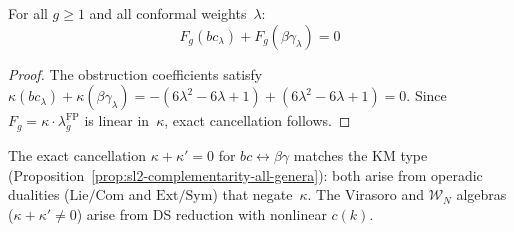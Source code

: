\begin{proposition}\label{prop:fermion-complementarity}
For all $g \geq 1$ and all conformal weights~$\lambda$:
\begin{equation}\label{eq:fermion-complementarity}
F_g(bc_\lambda) + F_g(\beta\gamma_\lambda) = 0
\end{equation}
\end{proposition}

\begin{proof}
The obstruction coefficients satisfy
$\kappa(bc_\lambda) + \kappa(\beta\gamma_\lambda)
= -(6\lambda^2 - 6\lambda + 1) + (6\lambda^2 - 6\lambda + 1) = 0$.
Since $F_g = \kappa \cdot \lambda_g^{\mathrm{FP}}$ is linear
in~$\kappa$, exact cancellation follows.
\end{proof}

\begin{remark}
\label{rem:fermion-complementarity-type}
The exact cancellation $\kappa + \kappa' = 0$ for $bc \leftrightarrow \beta\gamma$ matches the KM type (Proposition~\ref{prop:sl2-complementarity-all-genera}): both arise from operadic dualities ($\mathrm{Lie}/\mathrm{Com}$ and $\mathrm{Ext}/\mathrm{Sym}$) that negate~$\kappa$.  The Virasoro and $\mathcal{W}_N$ algebras ($\kappa + \kappa' \neq 0$) arise from DS reduction with nonlinear $c(k)$.
\end{remark}


